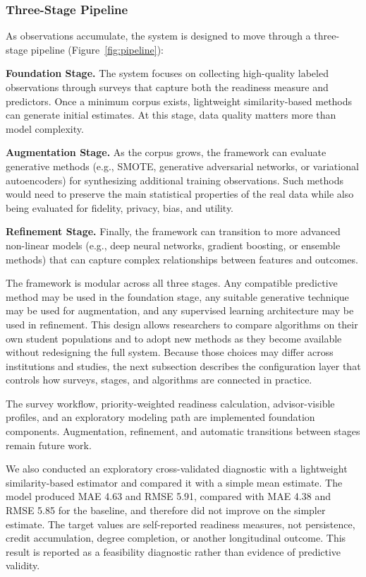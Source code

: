 \documentclass[letterpaper,11pt]{article}
\begin{document}
\subsubsection{Three-Stage Pipeline}

As observations accumulate, the system is designed to move through a three-stage pipeline (Figure~\ref{fig:pipeline}):

\textbf{Foundation Stage.} The system focuses on collecting high-quality labeled observations through surveys that capture both the readiness measure and predictors. Once a minimum corpus exists, lightweight similarity-based methods can generate initial estimates. At this stage, data quality matters more than model complexity.

\textbf{Augmentation Stage.} As the corpus grows, the framework can evaluate generative methods (e.g., SMOTE, generative adversarial networks, or variational autoencoders) for synthesizing additional training observations. Such methods would need to preserve the main statistical properties of the real data while also being evaluated for fidelity, privacy, bias, and utility.

\textbf{Refinement Stage.} Finally, the framework can transition to more advanced non-linear models (e.g., deep neural networks, gradient boosting, or ensemble methods) that can capture complex relationships between features and outcomes.

The framework is modular across all three stages. Any compatible predictive method may be used in the foundation stage, any suitable generative technique may be used for augmentation, and any supervised learning architecture may be used in refinement. This design allows researchers to compare algorithms on their own student populations and to adopt new methods as they become available without redesigning the full system. Because those choices may differ across institutions and studies, the next subsection describes the configuration layer that controls how surveys, stages, and algorithms are connected in practice.

The survey workflow, priority-weighted readiness calculation, advisor-visible profiles, and an exploratory modeling path are implemented foundation components. Augmentation, refinement, and automatic transitions between stages remain future work.

We also conducted an exploratory cross-validated diagnostic with a lightweight similarity-based estimator and compared it with a simple mean estimate. The model produced MAE 4.63 and RMSE 5.91, compared with MAE 4.38 and RMSE 5.85 for the baseline, and therefore did not improve on the simpler estimate. The target values are self-reported readiness measures, not persistence, credit accumulation, degree completion, or another longitudinal outcome. This result is reported as a feasibility diagnostic rather than evidence of predictive validity.
\end{document}
